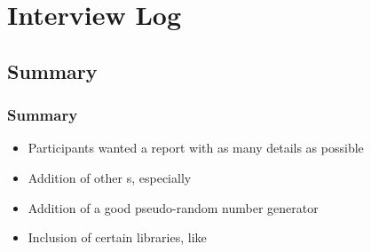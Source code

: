 \section{Interview Log}


\subsection{Summary}

\begin{frame}
\frametitle{Summary}
\begin{itemize}
\item Participants wanted a report with as many details as
  possible
\item Addition of other \ca s, especially \aes
\item Addition of a good pseudo-random number generator
\item Inclusion of certain libraries, like 
\end{itemize}
\end{frame}

